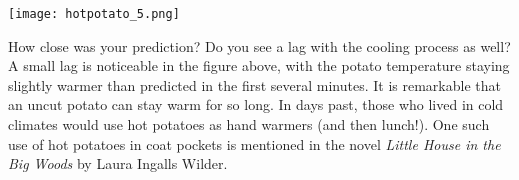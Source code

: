 \documentclass{ximera}
\begin{document}
\begin{image}
\texttt{[image: hotpotato\_5.png]}
\end{image}
 
How close was your prediction?  Do you see a lag with the cooling process as well?  A small lag is noticeable in the figure above, with the potato temperature staying slightly warmer than predicted in the first several minutes.  It is remarkable that an uncut potato can stay warm for so long.  In days past, those who lived in cold climates would use hot potatoes as hand warmers (and then lunch!).  One such use of hot potatoes in coat pockets is mentioned in the novel \textit{Little House in the Big Woods} by Laura Ingalls Wilder.
\end{document}
